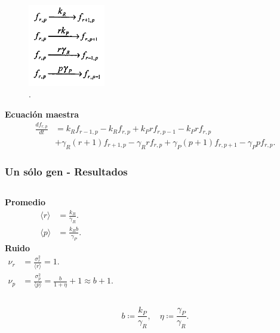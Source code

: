 \documentclass{beamer}
\begin{document}
\begin{frame}
\begin{figure}[p]
    \centering
    \includegraphics[width=0.3\textwidth]{scheme1.png}\\
    \tiny \cite{p1}.
\end{figure}
\centering \textbf{Ecuaci\'on maestra}
\begin{align*}
\frac{d{f}_{r,p}}{dt} &= k_Rf_{r-1,p} - k_Rf_{r,p} + k_Prf_{r,p-1} - k_Prf_{r,p}\\
&+ \gamma_R(r+1)f_{r+1,p} - \gamma_Rrf_{r,p} + \gamma_P(p+1)f_{r,p+1} - \gamma_Ppf_{r,p}.
\end{align*}
\end{frame}

\begin{frame}
\frametitle{Un s\'olo gen - Resultados}

\begin{columns}[c]
\centering \textbf{Promedio}
\begin{align*}
\langle r \rangle &= \frac{k_R}{\gamma_R}.\\[1.5ex]
\langle p \rangle &= \frac{k_Rb}{\gamma_P}.
\end{align*}
\centering \textbf{Ruido}
\begin{align*}
\nu_r &= \frac{\sigma_r^2}{\langle r \rangle} = 1.\\[1.5ex]
\nu_p &= \frac{\sigma_p^2}{\langle p \rangle} = \frac{b}{1+\eta} + 1 \approx b + 1.
\end{align*}
\end{columns}

\vspace{3 mm}

\begin{equation*}
b \coloneqq \frac{k_P}{\gamma_R}, \quad \eta \coloneqq \frac{\gamma_P}{\gamma_R}.
\end{equation*}

\end{frame}
\end{document}
